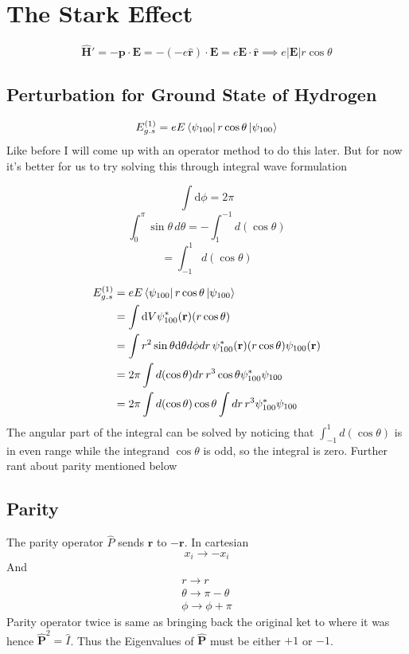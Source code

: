 \documentclass[10pt]{article}
\renewcommand{\vec}{\mathbf}
\renewcommand{\vec}{\mathbf}
\begin{document}
\section*{The Stark Effect} 
\[
\hat{\vec{H}}' = - \vec{p} \cdot \vec{E} =  - \left(- e \hat{\vec{r}}\right)\cdot \vec{E} = e \vec{E} \cdot  \hat{\vec{r}} \implies e |\vec{E}| r \cos \theta
\]
\subsection*{Perturbation for Ground State of Hydrogen} 
\[
	E^{(1)}_{g.s} = e E \bra{\psi_{100}} r \cos \theta \ket{\psi_{100}}
\] 
Like before I will come up with an operator method to do this later. But for now it's better for us to try solving this through integral wave formulation 
\begin{margintable}
	\[
	\int \mathrm{d} \phi = 2 \pi
	\] 
	\[
		\int_{0}^{\pi} \sin \theta \, d \theta = - \int_{1}^{-1} d (\cos \theta)
	\] 
	\[
	= \int_{-1}^{1} d (\cos \theta) 
	\] 
\end{margintable}
\begin{align*}
	E^{(1)}_{g.s} &= e E \bra{\psi_{100}} r \cos \theta \ket{\psi_{100}} \\ 
		      &= \int \mathrm{d} V \psi^{*}_{100} (\vec{r}) (r \cos \theta)  \\
		      &= \int r^2 \sin \theta \mathrm{d} \theta d \phi d r\,  \psi^{*}_{100} (\vec{r}) (r \cos \theta) 
		      \psi_{100}(\vec{r}) \\ 
		      &= 2 \pi \int d(\cos \theta ) dr \, r^3 \cos \theta \psi_{100}^{*} \psi_{100} \\
		      &= 2 \pi \int d(\cos \theta ) \cos \theta  \int dr \, r^3 \psi_{100}^{*} \psi_{100} \\
\end{align*}
The angular part of the integral can be solved by noticing that $\int_{-1}^{1} d(\cos \theta) $ is in even range while the integrand $\cos \theta$ is odd, so the integral is zero. Further rant about parity mentioned below

\subsection*{Parity} 
The parity operator $\hat{P}$ sends $\vec{r}$ to $- \vec{r}$. In cartesian 
\[
x_i \to  - x_i
\]  
And 
\begin{align*}
r \to  r \\ 
\theta \to  \pi - \theta \\ 
\phi \to  \phi + \pi 
\end{align*}
Parity operator twice is same as bringing back the original ket to where it was hence $\hat{\vec{P}}^2 = \hat{I}$. Thus the Eigenvalues of $\hat{\vec{P}}$ must be either $+1$ or $-1$. 
\end{document}
